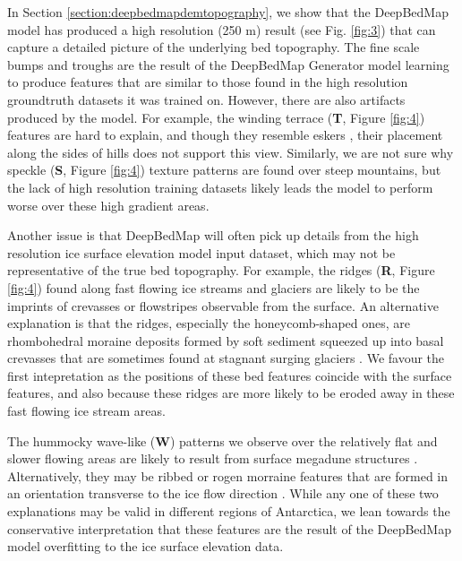 \documentclass[tc, manuscript]{copernicus}
\begin{document}
In Section \ref{section:deepbedmapdemtopography}, we show that the DeepBedMap model has produced a high resolution (250 m) result (see Fig. \ref{fig:3}) that can capture a detailed picture of the underlying bed topography.
The fine scale bumps and troughs are the result of the DeepBedMap Generator model learning to produce features that are similar to those found in the high resolution groundtruth datasets it was trained on.
However, there are also artifacts produced by the model.
For example, the winding terrace (\textbf{T}, Figure \ref{fig:4}) features are hard to explain, and though they resemble eskers \citep{DrewsActivelyevolvingsubglacial2017}, their placement along the sides of hills does not support this view.
Similarly, we are not sure why speckle (\textbf{S}, Figure \ref{fig:4}) texture patterns are found over steep mountains, but the lack of high resolution training datasets likely leads the model to perform worse over these high gradient areas.

Another issue is that DeepBedMap will often pick up details from the high resolution ice surface elevation model \citep{HowatReferenceElevationModel2019} input dataset, which may not be representative of the true bed topography.
For example, the ridges (\textbf{R}, Figure \ref{fig:4}) found along fast flowing ice streams and glaciers are likely to be the imprints of crevasses or flowstripes \citep{GlasserLongitudinalsurfacestructures2012} observable from the surface.
An alternative explanation is that the ridges, especially the honeycomb-shaped ones, are rhombohedral moraine deposits formed by soft sediment squeezed up into basal crevasses that are sometimes found at stagnant surging glaciers \citep{Dowdeswellvarietydistributionsubmarine2016,DowdeswellRhombohedralcrevassefillridges2016,SolheimSeafloormorphologyoutside1985}.
We favour the first intepretation as the positions of these bed features coincide with the surface features, and also because these ridges are more likely to be eroded away in these fast flowing ice stream areas.

The hummocky wave-like (\textbf{W}) patterns we observe over the relatively flat and slower flowing areas are likely to result from surface megadune structures \citep{ScambosSnowMegadune2014}.
Alternatively, they may be ribbed or rogen morraine features that are formed in an orientation transverse to the ice flow direction  \citep{HattestrandRibbedmorainesSweden1997,HattestrandRibbedmoraineformation1999}.
While any one of these two explanations may be valid in different regions of Antarctica, we lean towards the conservative interpretation that these features are the result of the DeepBedMap model overfitting to the ice surface elevation data.
\end{document}
